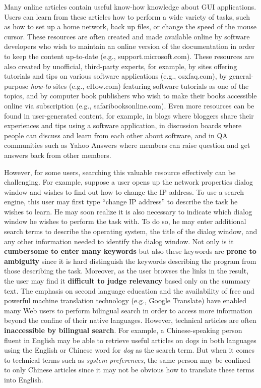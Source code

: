 \documentclass{www2010-submission}
\begin{document}
Many online articles contain useful know-how knowledge about GUI
applications. Users can learn from these articles how to perform a
wide variety of tasks, such as how to set up a home network, back up
files, or change the speed of the mouse cursor. These resources are
often created and made available online by software developers who
wish to maintain an online version of the documentation in order to keep the content up-to-date (e.g.,
support.microsoft.com). These resources are also created by
unofficial, third-party experts, for example, by sites offering
tutorials and tips on various software applications (e.g.,
osxfaq.com), by general-purpose \emph{how-to} sites (e.g., eHow.com)
featuring software tutorials as one of the topics, and by computer
book publishers who wish to make their books accessible online via
subscription (e.g., safaribooksonline.com). Even more resources can be
found in user-generated content, for example, in blogs where bloggers
share their experiences and tips using a software application, in
discussion boards where people can discuss and learn from each other
about software, and in QA communities such as Yahoo Answers where
members can raise question and get answers back from other members.

However, for some users, searching this valuable resource
effectively can be challenging. For example, suppose a user opens
up the network properties dialog window and wishes to find out how
to change the IP address. To use a search engine, this user may
first type ``change IP address'' to describe the task he wishes to
learn. He may soon realize it is also necessary to indicate which
dialog window he wishes to perform the task with. To do so, he may
enter additional search terms to describe the operating system,
the title of the dialog window, and any other information needed
to identify the dialog window. Not only is it \textbf{cumbersome
to enter many keywords} but also these keywords are \textbf{prone
to ambiguity} since it is hard distinguish the keywords describing
the program from those describing the task. Moreover, as the user
browses the links in the result, the user may find it
\textbf{difficult to judge relevancy} based only on the summary
text. The emphasis on second language education and the
availability of free and powerful machine translation technology
(e.g., Google Translate) have enabled many Web users to perform
bilingual search in order to access more information beyond the
confine of their native languages. However, technical articles are
often \textbf{inaccessible by bilingual search}. For example, a
Chinese-speaking person fluent in English may be able to retrieve
useful articles on dogs in both languages using the English or
Chinese word for \emph{dog} as the search term. But when it comes
to technical terms such as \emph{system preferences}, the same
person may be confined to only Chinese articles since it may not be
obvious how to translate these terms into English.
\end{document}
